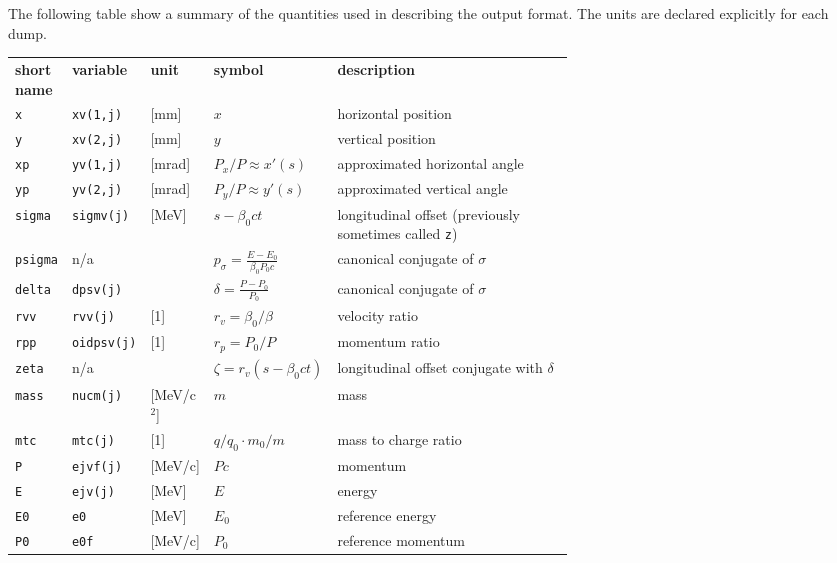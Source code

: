 The following table show a summary of the quantities used in describing the output format. The units are declared explicitly for each dump. 

\bigskip
\begin{longtabu}{@{}llllp{0.65\linewidth}}
    \textbf{short name} & \textbf{variable} & \textbf{unit} &
    \textbf{symbol} & \textbf{description} \\
    \texttt{x} & \texttt{xv(1,j)} &[mm] & $x$& horizontal position\\
    \texttt{y} & \texttt{xv(2,j)} &[mm] & $y$& vertical position\\
    \texttt{xp} & \texttt{yv(1,j)} &[mrad] & $P_x/P\approx x'(s)$&  approximated horizontal angle\\
    \texttt{yp} & \texttt{yv(2,j)} &[mrad]& $P_y/P\approx y'(s)$&  approximated vertical angle\\
    \texttt{sigma} & \texttt{sigmv(j)} &[MeV] & $s-\beta_0 c t $& longitudinal offset (previously sometimes called \texttt{z})\\
    \texttt{psigma} & n/a &  & $ p_\sigma=\frac{E-E_0}{\beta_0 P_0 c}$& canonical conjugate of $\sigma$ \\
    \texttt{delta} & \texttt{dpsv(j)} &  & $ \delta=\frac{P-P_0}{P_0}$& canonical conjugate of $\sigma$ \\
    \texttt{rvv}   & \texttt{rvv(j)} & [1]& $r_v=\beta_0/\beta$ &velocity ratio \\
    \texttt{rpp}   & \texttt{oidpsv(j)} & [1]& $r_p=P_0/P$ &momentum ratio \\
    \texttt{zeta} &  n/a & & $\zeta=r_v(s-\beta_0 c t) $& longitudinal offset conjugate with $\delta$\\
    \texttt{mass}  & \texttt{nucm(j)} & [MeV/c$^2$] & $m$ &mass \\
    \texttt{mtc}  & \texttt{mtc(j)} & [1] & $q/q_0 \cdot m_0/m $ & mass to charge ratio\\
    \texttt{P} & \texttt{ejvf(j)} &[MeV/c] & $Pc$& momentum \\
    \texttt{E} & \texttt{ejv(j)} &[MeV] & $E$& energy \\
    \texttt{E0} & \texttt{e0} &[MeV] & $E_0$& reference energy \\
    \texttt{P0} & \texttt{e0f} &[MeV/c] & $P_0$& reference momentum \\
\end{longtabu}

